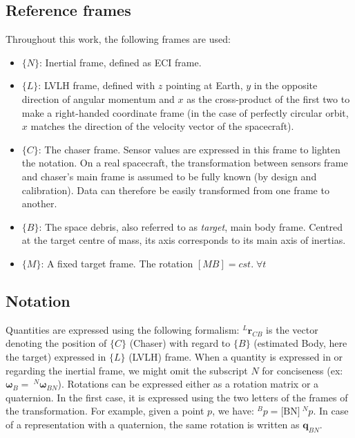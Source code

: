 \subsection{Reference frames}
Throughout this work, the following frames are used:
\begin{itemize}
	\setlength\itemsep{0em}
	\item $\{N\}$: Inertial frame, defined as \gls{ECI} frame.
	\item $\{L\}$: \gls{LVLH} frame, defined with $z$ pointing at Earth, $y$ in the opposite direction of angular momentum and $x$ as the cross-product of the first two to make a right-handed coordinate frame (in the case of perfectly circular orbit, $x$ matches the direction of the velocity vector of the spacecraft).
	\item $\{C\}$: The chaser frame. Sensor values are expressed in this frame to lighten the notation. On a real spacecraft, the transformation between sensors frame and chaser's main frame is assumed to be fully known (by design and calibration). Data can therefore be easily transformed from one frame to another.
	\item $\{B\}$: The space debris, also referred to as \emph{target}, main body frame. Centred at the target centre of mass, its axis corresponds to its main axis of inertias.
	\item $\{M\}$: A fixed target frame. The rotation $[MB] = cst. \; \forall t$
\end{itemize}

\subsection{Notation}
Quantities are expressed using the following formalism: $^{L}\boldsymbol{r}_{CB}$ is the vector denoting the position of $\{C\}$ (Chaser) with regard to $\{B\}$ (estimated Body, here the target) expressed in $\{L\}$ (\gls{LVLH}) frame. When a quantity is expressed in or regarding the inertial frame, we might omit the subscript $N$ for conciseness (ex: $\boldsymbol{\omega}_B = \: ^{N}\boldsymbol{\omega}_{BN}$). Rotations can be expressed either as a rotation matrix or a quaternion. In the first case, it is expressed using the two letters of the frames of the transformation. For example, given a point $p$, we have: $^Bp = \text{[BN]} \: ^Np$. In case of a representation with a quaternion, the same rotation is written as $\boldsymbol{q}_{BN}$.


